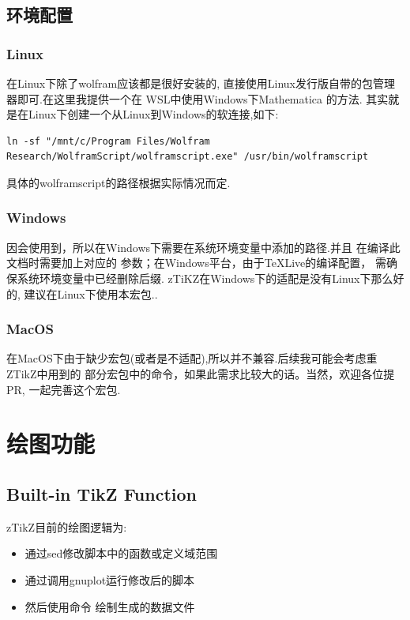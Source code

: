 \subsection{环境配置}
\subsubsection{Linux}
在Linux下除了wolfram应该都是很好安装的, 直接使用Linux发行版自带的包管理器即可.在这里我提供一个在
WSL中使用Windows下Mathematica 的方法. 其实就是在Linux下创建一个从Linux到Windows的软连接,如下:

\begin{verbatim}
ln -sf "/mnt/c/Program Files/Wolfram Research/WolframScript/wolframscript.exe" /usr/bin/wolframscript    
\end{verbatim}

具体的wolframscript的路径根据实际情况而定.

\subsubsection{Windows}
因会使用到，所以在Windows下需要在系统环境变量中添加的路径.并且
在编译此文档时需要加上对应的 参数；在Windows平台，由于\TeX{}Live的编译配置，
需确保系统环境变量中已经删除后缀. zTiKZ在Windows下的适配是没有Linux下那么好的,
建议在Linux下使用本宏包..

\subsubsection{MacOS}
在MacOS下由于缺少宏包(或者是不适配),所以并不兼容.后续我可能会考虑重ZTikZ中用到的
部分宏包中的命令，如果此需求比较大的话。当然，欢迎各位提 PR, 一起完善这个宏包.

\section{绘图功能}
\subsection{Built-in TikZ Function}
zTikZ目前的绘图逻辑为:
\begin{itemize}
    \item 通过sed修改脚本中的函数或定义域范围
    \item 通过调用gnuplot运行修改后的脚本
    \item 然后使用命令 绘制生成的数据文件
\end{itemize}

